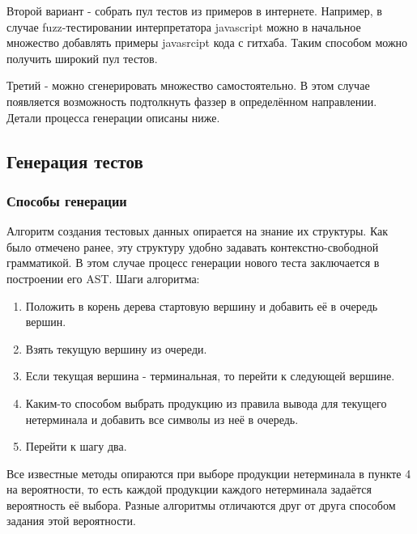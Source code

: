 \documentclass[a4paper]{article}
\begin{document}
Второй вариант - собрать пул тестов из примеров в интернете. Например, в случае fuzz-тестировании интерпретатора javascript можно в начальное множество добавлять примеры javasrcipt кода с гитхаба. Таким способом можно получить широкий пул тестов.
\indent

Третий - можно сгенерировать множество самостоятельно. В этом случае появляется возможность подтолкнуть фаззер в определённом направлении. Детали процесса генерации описаны ниже.

\subsection{Генерация тестов}
\indent

\subsubsection{Способы генерации}
\indent

Алгоритм создания тестовых данных опирается на знание их структуры. Как было отмечено ранее, эту структуру удобно задавать контекстно-свободной грамматикой. В этом случае процесс генерации нового теста заключается в построении его AST. Шаги алгоритма:

\begin{enumerate}
    \item Положить в корень дерева стартовую вершину и добавить её в очередь вершин.
    \item Взять текущую вершину из очереди.
    \item Если текущая вершина - терминальная, то перейти к следующей вершине.
    \item Каким-то способом выбрать продукцию из правила вывода для текущего нетерминала и добавить все символы из неё в очередь.
    \item Перейти к шагу два.
\end{enumerate}

Все известные методы опираются при выборе продукции нетерминала в пункте 4 на вероятности, то есть каждой продукции каждого нетерминала задаётся вероятность её выбора. Разные алгоритмы отличаются друг от друга способом задания этой вероятности. 
\end{document}
